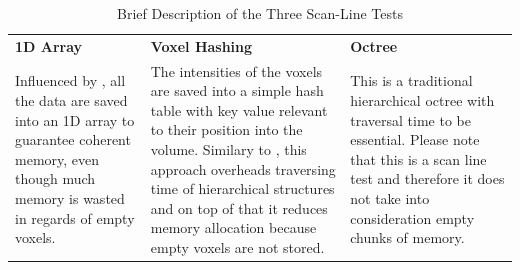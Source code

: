 \documentclass{subfiles}
\begin{document}
\begin{table}[!htbp]
	\renewcommand{\arraystretch}{1.3}
	
	\centering
	\begin{tabular}{|P{0.3\textwidth}|P{0.3\textwidth}|P{0.3\textwidth}|}
			
		\hline
		\textbf{1D Array} &	\textbf{Voxel Hashing} & \textbf{Octree}  \\
		\hlinewd{1.5pt}
		{\color{blue}Influenced by \cite{Hadwiger2012}, all the data are saved into an 1D array to guarantee coherent memory, even though much memory is wasted in regards of empty voxels.} &	{\color{blue}The intensities of the voxels are saved into a simple hash table with key value relevant to their position into the volume. Similary to \cite{Nievner2016voxelHashing}, this approach overheads traversing time of hierarchical structures and on top of that it reduces memory allocation because empty voxels are not stored. } & {\color{blue} This is a traditional  hierarchical octree with traversal time to be essential. Please note that this is a scan line test and therefore it does not take into consideration empty chunks of memory.}\\	
		\hline
	\end{tabular}
	\caption{Brief Description of the Three Scan-Line Tests}
	\label{tab:DataStructuresScanline}
\end{table}
\end{document}
